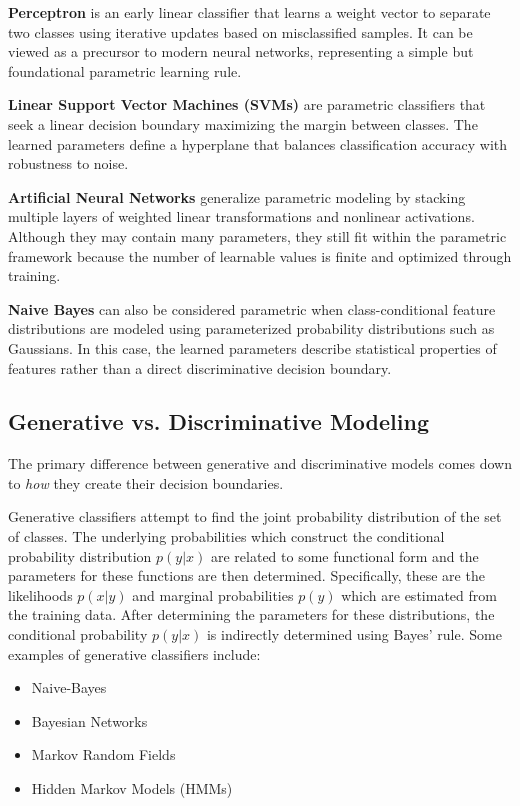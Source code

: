 \documentclass{article}
\begin{document}
\textbf{Perceptron} is an early linear classifier that learns a weight vector to separate two classes using iterative updates based on misclassified samples. It can be viewed as a precursor to modern neural networks, representing a simple but foundational parametric learning rule.

\textbf{Linear Support Vector Machines (SVMs)} are parametric classifiers that seek a linear decision boundary maximizing the margin between classes. The learned parameters define a hyperplane that balances classification accuracy with robustness to noise.

\textbf{Artificial Neural Networks} generalize parametric modeling by stacking multiple layers of weighted linear transformations and nonlinear activations. Although they may contain many parameters, they still fit within the parametric framework because the number of learnable values is finite and optimized through training.

\textbf{Naive Bayes} can also be considered parametric when class-conditional feature distributions are modeled using parameterized probability distributions such as Gaussians. In this case, the learned parameters describe statistical properties of features rather than a direct discriminative decision boundary.


\subsection{Generative vs. Discriminative Modeling}
The primary difference between generative and discriminative models comes down to \textit{how} they create their decision boundaries. 

Generative classifiers attempt to find the joint probability distribution of the set of classes. The underlying probabilities which construct the conditional probability distribution $p(y|x)$ are related to some functional form and the parameters for these functions are then determined. Specifically, these are the likelihoods $p(x|y)$ and marginal probabilities $p(y)$ which are estimated from the training data. After determining the parameters for these distributions, the conditional probability $p(y|x)$ is indirectly determined using Bayes' rule. Some examples of generative classifiers include:
\begin{itemize}
    \item Naive-Bayes
    \item Bayesian Networks
    \item Markov Random Fields
    \item Hidden Markov Models (HMMs)
\end{itemize}
\end{document}
